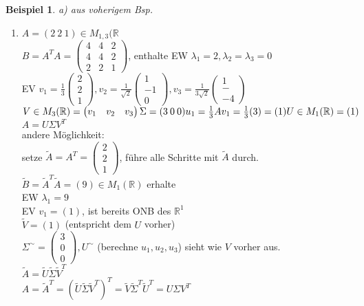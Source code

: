 \documentclass[a4paper,11pt]{article}
\newtheorem{bsp}[definition]{Beispiel}
\begin{document}
\begin{bsp}
a) aus voherigem Bsp.
\end{bsp}
\begin{enumerate}[label=\alph*)]
	\item $A=(2\:2\:1)\in M_{1,3}(\mathbb{R}$ \\
	$B=A^TA=\begin{pmatrix}4&4&2\\4&4&2\\2&2&1\end{pmatrix}$, enthalte EW $\lambda_1=2,\lambda_2=\lambda_3=0$ \\
	EV $v_1=\frac{1}{3}\begin{pmatrix}2\\2\\1\end{pmatrix}, v_2=\frac{1}{\sqrt{2}}\begin{pmatrix}1\\-1\\0\end{pmatrix}, v_3=\frac{1}{3\sqrt{2}}\begin{pmatrix}1\\-\\-4\end{pmatrix} $ \\
	$V\in M_3(\mathbb{R})=\begin{pmatrix}v_1&v_2&v_3\end{pmatrix} \\
	\Sigma=(3\:0\:0) \\
	u_1=\frac{1}{3}Av_1=\frac{1}{3}(3)=(1) \\
	U\in M_1(\mathbb{R})=(1)$ \\
	$A=U\Sigma V^T$ \\
	andere Möglichkeit: \\
	setze $\tilde A=A^T=\begin{pmatrix}2\\2\\1\end{pmatrix}$, führe alle Schritte mit $\tilde A$ durch. \\
	$\tilde B=\tilde A^T\tilde A=(9)\in M_1(\mathbb{R})$ erhalte \\
	EW $\lambda_1=9$ \\
	EV $v_1=(1)$, ist bereits ONB des $\mathbb{R}^1$ \\
	$\tilde V=(1)$ (entspricht dem $U$ vorher) \\
	$\Sigma^\sim=\begin{pmatrix}3\\0\\0\end{pmatrix}, U^\sim$ (berechne $u_1,u_2,u_3$) sieht wie $V$ vorher aus. \\
	$\tilde A=\tilde U\tilde\Sigma\tilde V^T$ \\
	$A=\tilde A^T=(\tilde U\tilde\Sigma\tilde V^T)^T=\tilde V\tilde\Sigma^T\tilde U^T=U\Sigma V^T$
\end{enumerate}
\end{document}
